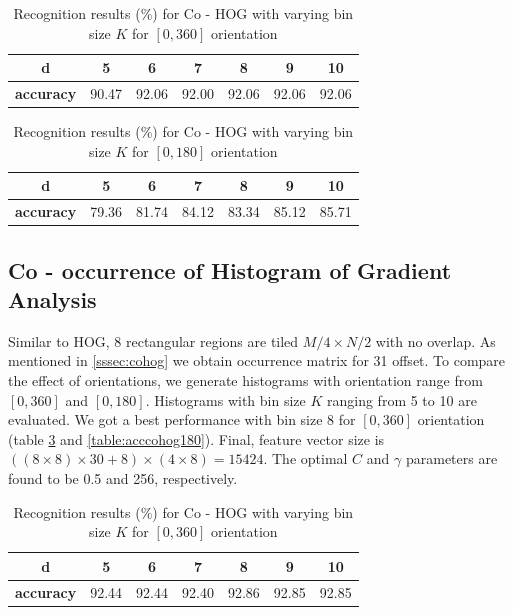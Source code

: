 \begin{table}[h] 
\begin{center}
	\caption{Recognition results (\%) for Co - HOG with varying bin size $K$ for $[0, 360]$ orientation} 
    \begin{tabular}{| c | c | c | c | c | c | c |}
    \hline
    \textbf{d} &  5  &  6  &  7  &  8  &  9  &  10\\  \hline
		 \textbf{accuracy} & 90.47 &  92.06  &  92.00  &  92.06  &  92.06  &  92.06 \\  \hline
    \end{tabular}
		\label{table:acchog360} 
\end{center}
\end{table}

\begin{table}[h] 
\begin{center}
	\caption{Recognition results (\%) for Co - HOG with varying bin size $K$ for $[0, 180]$ orientation} 
    \begin{tabular}{| c | c | c | c | c | c | c |}
    \hline
    \textbf{d} &  5  &  6  &  7  &  8  &  9  &  10\\  \hline
		 \textbf{accuracy} & 79.36 &  81.74  &  84.12  &  83.34  &  85.12  &  85.71 \\  \hline
    \end{tabular}
		\label{table:acchog180} 
\end{center}
\end{table}


\subsection{Co - occurrence of Histogram of Gradient Analysis}
Similar to HOG, 8 rectangular regions are tiled $M/4 \times N/2$ with no overlap. As mentioned in \ref{sssec:cohog} we obtain occurrence matrix for 31 offset. To compare the effect of orientations, we generate histograms with orientation range from $[0, 360]$ and $[0, 180]$. Histograms with bin size $K$ ranging from 5 to 10 are evaluated. We got a best performance with bin size 8 for $[0, 360]$ orientation (table \ref{table:acccohog360} and \ref{table:acccohog180}). Final, feature vector size is $((8 \times 8) \times 30 + 8) \times ( 4 \times 8) = 15424$. The optimal $C$ and $\gamma$ parameters are found to be 0.5 and 256, respectively.

\begin{table}[h] 
\begin{center}
	\caption{Recognition results (\%) for Co - HOG with varying bin size $K$ for $[0, 360]$ orientation} 
    \begin{tabular}{| c | c | c | c | c | c | c |}
    \hline
    \textbf{d} &  5  &  6  &  7  &  8  &  9  &  10\\  \hline
		 \textbf{accuracy} & 92.44 &  92.44  &  92.40  &  92.86  &  92.85  &  92.85 \\  \hline
    \end{tabular}
		\label{table:acccohog360} 
\end{center}
\end{table}

